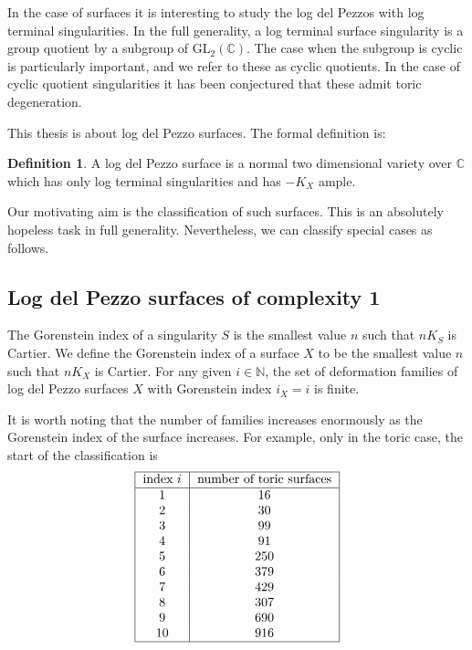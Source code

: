 \documentclass[12pt,a4paper]{book}      %
\theoremstyle{definition}
\newtheorem{dfn}[thm]{Definition}
\newcommand{\mb}[1]{\mathbb{#1}}
\newcommand{\gl}{\text{GL}_2 (\mathbb{C})}
\begin{document}
 
 


In the case of surfaces it is interesting to study the log del Pezzos with log terminal singularities. In the full generality, a log terminal surface singularity is a group quotient by a subgroup of $\gl$. The case when the subgroup is cyclic is particularly important, and we refer to these as cyclic quotients. In the case of cyclic quotient singularities it has been conjectured that these admit toric degeneration.


This thesis is about log del Pezzo surfaces. The formal definition is:
\begin{dfn}\label{beginnersdef}
A log del Pezzo surface is a normal two dimensional variety over $\mb{C}$ which has only log terminal singularities and has $-K_X$ ample.
\end{dfn}


Our motivating aim is the classification of such surfaces.
This is an absolutely hopeless task in full generality.
Nevertheless, we can classify special cases as follows.

\subsection{Log del Pezzo surfaces of complexity 1}
The Gorenstein index of a singularity $S$ is the smallest value $n$ such that $n K_S$ is Cartier. We define the Gorenstein index of a surface $X$ to be the smallest value $n$ such that $nK_X$ is Cartier.
For any given $i \in \mathbb{N}$, the set of deformation
families of log del Pezzo surfaces $X$ with Gorenstein index $i_X=i$
is finite.

It is worth noting that the number of families increases enormously as the Gorenstein
index of the surface increases. For example, only in the toric case, 
the start of the classification is
\[
\begin{tabular}{| c | c |}
\hline
\text{index $i$} & \text{number of toric surfaces}\\ \hline
1 & 16 \\
2 & 30 \\
3 & 99  \\
4 & 91  \\
5 & 250 \\
6 & 379 \\
7 & 429 \\
8 & 307 \\
9 & 690 \\
10 & 916 \\
\hline
\end{tabular}
\]
\end{document}
